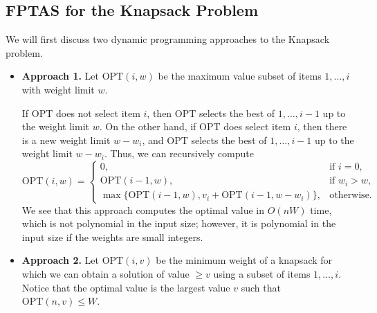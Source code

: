 \subsection{FPTAS for the Knapsack Problem}\label{subsec:3.4}
We will first discuss two dynamic programming approaches to the 
{\sc Knapsack} problem. 
\begin{itemize}
    \item {\bf Approach 1.} Let $\text{OPT}(i, w)$ be the maximum 
    value subset of items $1, \dots, i$ with weight limit $w$. 

    If $\text{OPT}$ does not select item $i$, then $\text{OPT}$ selects 
    the best of $1, \dots, i-1$ up to the weight limit $w$. 
    On the other hand, if $\text{OPT}$ does select item $i$, then 
    there is a new weight limit $w - w_i$, and $\text{OPT}$ selects the 
    best of $1, \dots, i-1$ up to the weight limit $w - w_i$. Thus, 
    we can recursively compute 
    \[ \text{OPT}(i, w) = \begin{cases}
        0, & \text{if } i = 0, \\ 
        \text{OPT}(i-1, w), & \text{if } w_i > w, \\ 
        \max\{\text{OPT}(i-1, w), v_i + \text{OPT}(i-1, w-w_i)\}, & 
        \text{otherwise.} 
    \end{cases} \] 
    We see that this approach computes the optimal value in $O(nW)$ time, 
    which is not polynomial in the input size; however, it is polynomial 
    in the input size if the weights are small integers. 

    \item {\bf Approach 2.} Let $\text{OPT}(i, v)$ be the minimum weight 
    of a knapsack for which we can obtain a solution of value $\geq v$ 
    using a subset of items $1, \dots, i$. Notice that the optimal value 
    is the largest value $v$ such that $\text{OPT}(n, v) \leq W$. 


\end{itemize}
